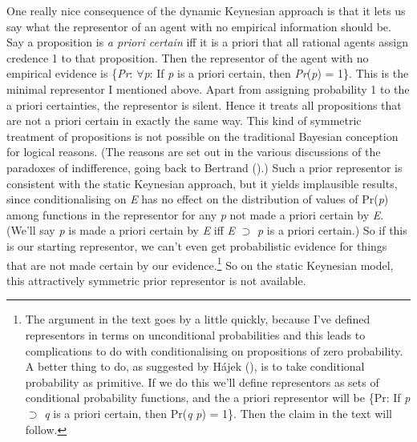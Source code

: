 \documentclass[
  11pt,
  letterpaper,
  DIV=11,
  numbers=noendperiod,
  oneside]{scrartcl}
\begin{document}
One really nice consequence of the dynamic Keynesian approach is that it
lets us say what the representor of an agent with no empirical
information should be. Say a proposition is \emph{a priori certain} iff
it is a priori that all rational agents assign credence 1 to that
proposition. Then the representor of the agent with no empirical
evidence is \{\emph{Pr}: \({\forall}\)\emph{p}: If \emph{p} is a priori
certain, then \emph{Pr}(\emph{p}) = 1\}. This is the minimal representor
I mentioned above. Apart from assigning probability 1 to the a priori
certainties, the representor is silent. Hence it treats all propositions
that are not a priori certain in exactly the same way. This kind of
symmetric treatment of propositions is not possible on the traditional
Bayesian conception for logical reasons. (The reasons are set out in the
various discussions of the paradoxes of indifference, going back to
Bertrand ().) Such a prior representor
is consistent with the static Keynesian approach, but it yields
implausible results, since conditionalising on \emph{E} has no effect on
the distribution of values of Pr(\emph{p}) among functions in the
representor for any \emph{p} not made a priori certain by \emph{E}.
(We'll say \emph{p} is made a priori certain by \emph{E} iff \emph{E}
\({\supset}\) \emph{p} is a priori certain.) So if this is our starting
representor, we can't even get probabilistic evidence for things that
are not made certain by our evidence.\footnote{The argument in the text
  goes by a little quickly, because I've defined representors in terms
  on unconditional probabilities and this leads to complications to do
  with conditionalising on propositions of zero probability. A better
  thing to do, as suggested by Hájek (),
  is to take conditional probability as primitive. If we do this we'll
  define representors as sets of conditional probability functions, and
  the a priori representor will be \{Pr: If \emph{p} \({\supset}\)
  \emph{q} is a priori certain, then Pr(\emph{q} \emph{p}) = 1\}. Then
  the claim in the text will follow.} So on the static Keynesian model,
this attractively symmetric prior representor is not available.
\end{document}
